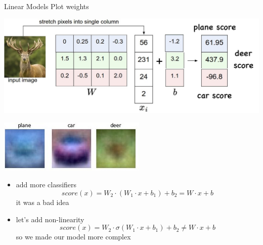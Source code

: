 \documentclass{beamer}
\begin{document}
\begin{frame}{Linear Models Plot weights}
	\begin{center}
		  \includegraphics[scale=0.17]{img/clf3}
		
		  \includegraphics[scale=0.5]{img/w1}
	\end{center}
	\begin{itemize}
		\item    add more classifiers
		  $$score (x) = W_2\cdot(W_1\cdot x + b_1) + b_2 = W\cdot x + b$$
		  it was a bad idea \frownie{} 
		\item    let's add non-linearity
		$$score (x) = W_2\cdot\sigma(W_1\cdot x + b_1) + b_2 \neq W\cdot x + b$$
		  so we made our model more complex \blacksmiley{}
	\end{itemize}
\end{frame}
\end{document}
